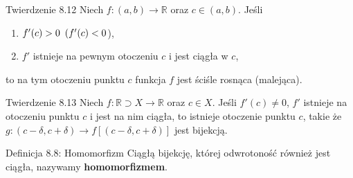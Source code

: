 \documentclass{article}
\newcommand{\hquad}{\mkern9mu}
\newcommand{\R}{\mathbb{R}}
\begin{document}
\begin{twier}{Twierdzenie 8.12}
    Niech $f:(a,b)\to\R$ oraz $c\in(a,b)$. Jeśli 
    \begin{enumerate}
        \item $f'(c)>0\hquad (f'(c)<0$),
        \item $f'$ istnieje na pewnym otoczeniu $c$ i jest ciągła w $c$,
    \end{enumerate}
    to na tym otoczeniu punktu $c$ funkcja $f$ jest ściśle rosnąca (malejąca).
\end{twier}

\begin{twier}{Twierdzenie 8.13}
    Niech $f:\R\supset X\to\R$ oraz $c\in X$. Jeśli $f'(c)\neq0$, $f'$ istnieje na otoczeniu punktu $c$ i jest na nim ciągła, to istnieje otoczenie punktu $c$, takie że $g:(c-\delta,c+\delta)\to f[(c-\delta,c+\delta)]$ jest bijekcją.
\end{twier}

\begin{defr}{Definicja 8.8: Homomorfizm}
    Ciągłą bijekcję, której odwrotoność również jest ciągła, nazywamy \textbf{homomorfizmem}.
\end{defr}

\end{document}
